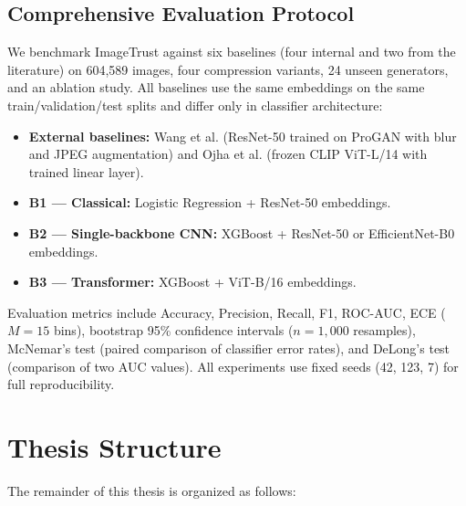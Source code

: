 \documentclass[12pt,a4paper]{book}
\theoremstyle{definition}
\theoremstyle{remark}
\begin{document}
\subsection{Comprehensive Evaluation Protocol}\label{sec:contrib-evaluation}

We benchmark ImageTrust against six baselines (four internal and two from the literature) on 604,589 images, four compression variants, 24 unseen generators, and an ablation study. All baselines use the same embeddings on the same train/validation/test splits and differ only in classifier architecture:

\begin{itemize}
    \item \textbf{External baselines:} Wang et al. \cite{wang2020cnn} (ResNet-50 trained on ProGAN with blur and JPEG augmentation) and Ojha et al. \cite{ojha2023towards} (frozen CLIP ViT-L/14 with trained linear layer).
    \item \textbf{B1 --- Classical:} Logistic Regression + ResNet-50 embeddings.
    \item \textbf{B2 --- Single-backbone CNN:} XGBoost + ResNet-50 or EfficientNet-B0 embeddings.
    \item \textbf{B3 --- Transformer:} XGBoost + ViT-B/16 embeddings.
\end{itemize}

Evaluation metrics include Accuracy, Precision, Recall, F1, ROC-AUC, ECE ($M{=}15$ bins), bootstrap 95\% confidence intervals ($n{=}1{,}000$ resamples), McNemar's test (paired comparison of classifier error rates), and DeLong's test (comparison of two AUC values). All experiments use fixed seeds (42, 123, 7) for full reproducibility.


\section{Thesis Structure}\label{sec:structure}

The remainder of this thesis is organized as follows:
\end{document}
